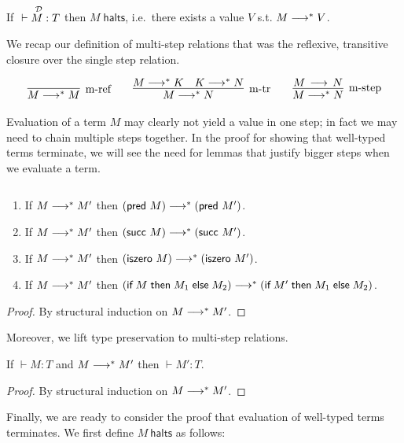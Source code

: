 \begin{theorem}
If $\overset{{\mathcal{D}}}{~\vdash M : T}$ then $M\;\mathsf{halts}$, i.e.~there exists a value $V$ s.t. $M
\longrightarrow^* V$. 
\end{theorem}

We recap our definition of multi-step relations that was the
reflexive, transitive closure over the single step relation.

\[
\begin{array}{c}
\infer[\text{m-ref}]{M \mstep M}{}
\qquad
\infer[\text{m-tr}]{M \mstep N}{M \mstep K & K \mstep N}
\qquad
\infer[\text{m-step}]{M \mstep N}{M \steps N}
\end{array}
\]

Evaluation of a term $M$ may clearly not yield a value in one step; in fact we may need to chain multiple steps together. 
In the proof for showing that well-typed terms terminate, we will see the need for lemmas that justify bigger steps when we evaluate a term.

\begin{lemma}$\;$\\
  \begin{enumerate}
  \item If $M \longrightarrow^* M'$ then $(\textsf{pred}~M) \longrightarrow^* (\textsf{pred}~M')$.
  \item If $M \longrightarrow^* M'$ then $(\textsf{succ}~M) \longrightarrow^* (\textsf{succ}~M')$.
  \item If $M \longrightarrow^* M'$ then $(\textsf{iszero}~M) \longrightarrow^* (\textsf{iszero}~M')$.
  \item If $M \longrightarrow^* M'$ then $(\textsf{if\;} M \textsf{\;then\;} M_1 \textsf{\;else\;} M_2) \longrightarrow^* (\textsf{if\;} M' \textsf{\;then\;} M_1 \textsf{\;else\;} M_2)$.
  \end{enumerate} 
\end{lemma}
\begin{proof}
By structural induction  on $M \longrightarrow^* M'$.
\end{proof}

Moreover, we lift type preservation to multi-step relations.

\begin{lemma}
If $\vdash M : T$ and $M \longrightarrow^* M'$ then $\vdash M':T$.  
\end{lemma}
\begin{proof}
By structural induction on $M \longrightarrow^* M'$.  
\end{proof}

Finally, we are ready to consider the proof that evaluation of well-typed terms
terminates. We first define $M~\mathsf{halts}$ as follows:

